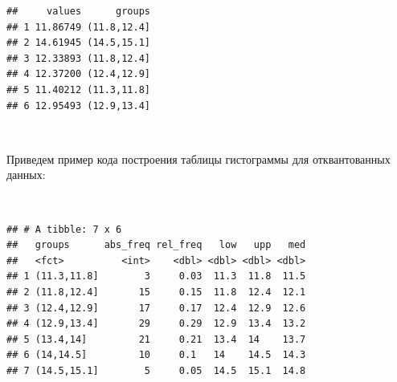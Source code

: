\documentclass[
  14,
]{article}
\newenvironment{Shaded}{\begin{snugshade}}{\end{snugshade}}
\newcommand{\AttributeTok}[1]{\textcolor[rgb]{0.77,0.63,0.00}{#1}}
\newcommand{\CommentTok}[1]{\textcolor[rgb]{0.56,0.35,0.01}{\textit{#1}}}
\newcommand{\DecValTok}[1]{\textcolor[rgb]{0.00,0.00,0.81}{#1}}
\newcommand{\FunctionTok}[1]{\textcolor[rgb]{0.00,0.00,0.00}{#1}}
\newcommand{\NormalTok}[1]{#1}
\newcommand{\OtherTok}[1]{\textcolor[rgb]{0.56,0.35,0.01}{#1}}
\newcommand{\SpecialCharTok}[1]{\textcolor[rgb]{0.00,0.00,0.00}{#1}}
\begin{document}
\begin{verbatim}
##     values      groups
## 1 11.86749 (11.8,12.4]
## 2 14.61945 (14.5,15.1]
## 3 12.33893 (11.8,12.4]
## 4 12.37200 (12.4,12.9]
## 5 11.40212 (11.3,11.8]
## 6 12.95493 (12.9,13.4]
\end{verbatim}

\(\ \)

Приведем пример кода построения таблицы гистограммы для отквантованных
данных:

\(\ \)

\begin{Shaded}
\end{Shaded}

\begin{verbatim}
## # A tibble: 7 x 6
##   groups      abs_freq rel_freq   low   upp   med
##   <fct>          <int>    <dbl> <dbl> <dbl> <dbl>
## 1 (11.3,11.8]        3     0.03  11.3  11.8  11.5
## 2 (11.8,12.4]       15     0.15  11.8  12.4  12.1
## 3 (12.4,12.9]       17     0.17  12.4  12.9  12.6
## 4 (12.9,13.4]       29     0.29  12.9  13.4  13.2
## 5 (13.4,14]         21     0.21  13.4  14    13.7
## 6 (14,14.5]         10     0.1   14    14.5  14.3
## 7 (14.5,15.1]        5     0.05  14.5  15.1  14.8
\end{verbatim}
\end{document}
